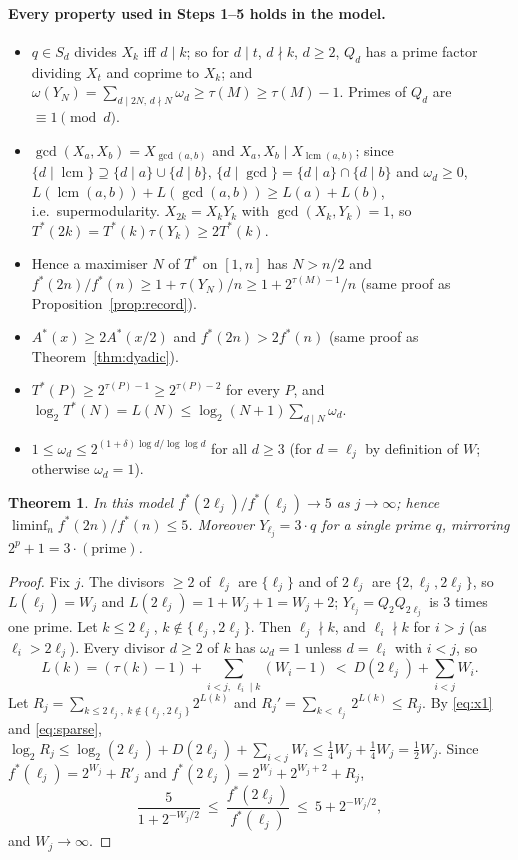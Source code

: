 \documentclass[11pt]{article}
\newtheorem{theorem}{Theorem}
\theoremstyle{remark}
\newcommand{\lcm}{\operatorname{lcm}}
\begin{document}
\paragraph{Every property used in Steps 1--5 holds in the model.}
\begin{itemize}
\item[(M1)] $q\in S_d$ divides $X_k$ iff $d\mid k$; so for $d\mid t$, $d\nmid k$, $d\ge2$, $Q_d$
  has a prime factor dividing $X_t$ and coprime to $X_k$; and
  $\omega(Y_N)=\sum_{d\mid2N,\,d\nmid N}\omega_d\ge\tau(M)\ge\tau(M)-1$. Primes of $Q_d$ are
  $\equiv1\pmod d$.
\item[(M2)] $\gcd(X_a,X_b)=X_{\gcd(a,b)}$ and $X_a,X_b\mid X_{\lcm(a,b)}$; since
  $\{d\mid\lcm\}\supseteq\{d\mid a\}\cup\{d\mid b\}$, $\{d\mid\gcd\}=\{d\mid a\}\cap\{d\mid b\}$ and
  $\omega_d\ge0$, $L(\lcm(a,b))+L(\gcd(a,b))\ge L(a)+L(b)$, i.e.\ supermodularity. $X_{2k}=X_kY_k$
  with $\gcd(X_k,Y_k)=1$, so $T^*(2k)=T^*(k)\tau(Y_k)\ge2T^*(k)$.
\item[(M3)] Hence a maximiser $N$ of $T^*$ on $[1,n]$ has $N>n/2$ and
  $f^*(2n)/f^*(n)\ge1+\tau(Y_N)/n\ge1+2^{\tau(M)-1}/n$ (same proof as
  Proposition~\ref{prop:record}).
\item[(M4)] $A^*(x)\ge2A^*(x/2)$ and $f^*(2n)>2f^*(n)$ (same proof as Theorem~\ref{thm:dyadic}).
\item[(M5)] $T^*(P)\ge2^{\tau(P)-1}\ge2^{\tau(P)-2}$ for every $P$, and
  $\log_2T^*(N)=L(N)\le\log_2(N+1)\sum_{d\mid N}\omega_d$.
\item[(M6)] $1\le\omega_d\le2^{(1+\delta)\log d/\log\log d}$ for all $d\ge3$ (for $d=\ell_j$ by
  definition of $W$; otherwise $\omega_d=1$).
\end{itemize}

\begin{theorem}\label{thm:model}
In this model $f^*(2\ell_j)/f^*(\ell_j)\to5$ as $j\to\infty$; hence $\liminf_n f^*(2n)/f^*(n)\le5$.
Moreover $Y_{\ell_j}=3\cdot q$ for a single prime $q$, mirroring $2^p+1=3\cdot(\text{prime})$.
\end{theorem}
\begin{proof}
Fix $j$. The divisors $\ge2$ of $\ell_j$ are $\{\ell_j\}$ and of $2\ell_j$ are $\{2,\ell_j,2\ell_j\}$, so
$L(\ell_j)=W_j$ and $L(2\ell_j)=1+W_j+1=W_j+2$; $Y_{\ell_j}=Q_2Q_{2\ell_j}$ is $3$ times one prime.
Let $k\le2\ell_j$, $k\notin\{\ell_j,2\ell_j\}$. Then $\ell_j\nmid k$, and $\ell_i\nmid k$ for $i>j$
(as $\ell_i>2\ell_j$). Every divisor $d\ge2$ of $k$ has $\omega_d=1$ unless $d=\ell_i$ with $i<j$, so
\[
  L(k)=(\tau(k)-1)+\sum_{i<j,\ \ell_i\mid k}(W_i-1)\ <\ D(2\ell_j)+\sum_{i<j}W_i .
\]
Let $R_j=\sum_{k\le2\ell_j,\ k\notin\{\ell_j,2\ell_j\}}2^{L(k)}$ and $R_j'=\sum_{k<\ell_j}2^{L(k)}\le R_j$.
By \eqref{eq:x1} and \eqref{eq:sparse},
$\log_2R_j\le\log_2(2\ell_j)+D(2\ell_j)+\sum_{i<j}W_i\le\frac14W_j+\frac14W_j=\frac12W_j$. Since
$f^*(\ell_j)=2^{W_j}+R'_j$ and $f^*(2\ell_j)=2^{W_j}+2^{W_j+2}+R_j$,
\[
  \frac{5}{1+2^{-W_j/2}}\ \le\ \frac{f^*(2\ell_j)}{f^*(\ell_j)}\ \le\ 5+2^{-W_j/2},
\]
and $W_j\to\infty$.
\end{proof}
\end{document}
